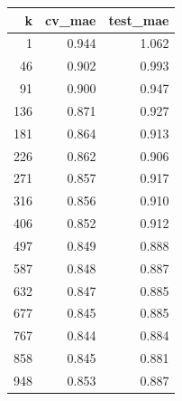 \begin{tabular}{rrr}
\toprule
k & cv_mae & test_mae \\
\midrule
1 & 0.944 & 1.062 \\
46 & 0.902 & 0.993 \\
91 & 0.900 & 0.947 \\
136 & 0.871 & 0.927 \\
181 & 0.864 & 0.913 \\
226 & 0.862 & 0.906 \\
271 & 0.857 & 0.917 \\
316 & 0.856 & 0.910 \\
406 & 0.852 & 0.912 \\
497 & 0.849 & 0.888 \\
587 & 0.848 & 0.887 \\
632 & 0.847 & 0.885 \\
677 & 0.845 & 0.885 \\
767 & 0.844 & 0.884 \\
858 & 0.845 & 0.881 \\
948 & 0.853 & 0.887 \\
\bottomrule
\end{tabular}
